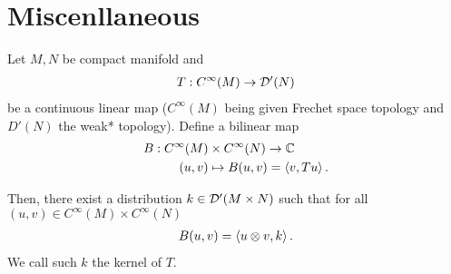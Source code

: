 \documentclass{article}
\begin{document}
\section{Miscenllaneous} 
\begin{ftheorem} Let $M, N$ be compact manifold and 
    \begin{align*}
    T: C^\infty(M) \to \D'(N) \\
    \end{align*}
    be a continuous linear map ($C^\infty(M)$ being given Frechet space topology and $D'(N)$ the weak* topology). Define a bilinear map 
    \begin{align*}
    B: C^\infty(M) &\times C^\infty(N) \to \C \\
    (u, v) &\mapsto B(u, v) = \inprod[v, Tu]. 
    \end{align*}
    
    Then, there exist a distribution $k \in \D'(M \times N)$ such that for all $(u, v) \in C^\infty(M) \times C^\infty(N)$
    \begin{align*}
    B(u, v) = \inprod[u \otimes v, k]. 
    \end{align*}
    We call such $k$ the kernel of $T$. 
\end{ftheorem}




\end{document}
